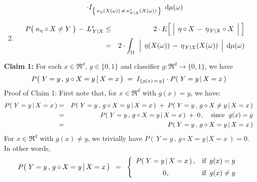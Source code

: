 \begin{theorem}
\begin{enumerate}
\begin{eqnarray*}
			\cdot
			I_{\left\{\,\kappa_{\eta}(X(\omega)) \,\neq\, \kappa^{*}_{Y \vert X}(X(\omega))\,\right\}}
			\,\;\textnormal{d}\mu(\omega)
	\end{eqnarray*}
\item
	\begin{eqnarray*}
	P\!\left(\;\kappa_{\eta} \overset{{\color{white}.}}{\circ} X \neq Y \;\right) \,-\, L^{*}_{\,Y \vert X}
	& \leq &
		2 \cdot E\!\left[\;
			\left\vert\;\, \eta \circ X \,\overset{{\color{white}.}}{-}\, \eta_{\,Y\vert X} \circ X \;\,\right\vert
			\;\right]
	\\
	& = &
		2 \cdot \int_{\Omega}\,\;
			\left\vert\;\, \eta(X(\omega)) \,\overset{{\color{white}.}}{-}\, \eta_{\,Y\vert X}(X(\omega)) \;\,\right\vert
			\;\d\mu(\omega)
	\end{eqnarray*}
\end{enumerate}
\end{theorem}
\proof
\vskip 0.2cm
\noindent
\textbf{Claim 1:}\quad
For each $x \in \Re^{d}$, $y \in \{0,1\}$ and classifier $g : \Re^{d} \longrightarrow \{0,1\}$,
we have
\begin{equation*}
P\!\left(\,\left. Y = y \,,\, \overset{{\color{white}.}}{g} \circ X = y \,\right\vert X = x \,\right)
\;=\;
I_{\{g(x)\,=\,y\}} \cdot P\!\left(\,\left. Y = y \,\right\vert X = x \,\right)
\end{equation*}
Proof of Claim 1:\;
First note that, for $x \in \Re^{d}$ with $g(x) = y$, we have:
\begin{eqnarray*}
P\!\left(\,\left. Y = y \,\right\vert X = x \,\right)
& = &
	P\!\left(\,\left. Y = y\,,\, g \circ X = y \,\right\vert X = x \,\right)
	\; + \;
	P\!\left(\,\left. Y = y\,,\, g \circ X \neq y \,\right\vert X = x \,\right)
\\
& = &
	P\!\left(\,\left. Y = y\,,\, g \circ X = y \,\right\vert X = x \,\right)
	\; + \;
	0\,,
	\quad
	\textnormal{since \;$g(x) = y$}
\\
& = &
	P\!\left(\,\left. Y = y\,,\, g \circ X = y \,\right\vert X = x \,\right)
\end{eqnarray*}
For $x \in \Re^{d}$ with $g(x) \neq y$, we trivially have
$P\!\left(\,\left. Y = y\,,\, g \circ X = y \,\right\vert X = x \,\right) = 0$.
In other words,
\begin{equation*}
P\!\left(\,\left. Y = y \,,\, \overset{{\color{white}.}}{g} \circ X = y \,\right\vert X = x \,\right)
\;\; = \;\;
	\left\{\begin{array}{cl}
	P\!\left(\,\left. Y = y \,\right\vert X = x \,\right), & \textnormal{if \,$g(x) = y$}
	\\
	\overset{{\color{white}-}}{0}, & \textnormal{if \,$g(x) \neq y$}
	\end{array}\right.
\end{equation*}
